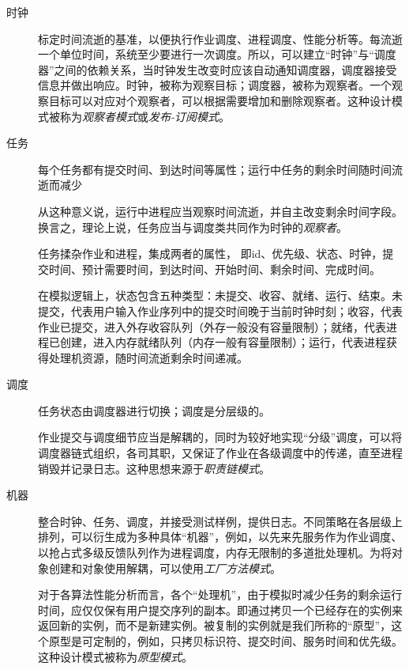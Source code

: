 \documentclass[12pt, a4paper, UTF8]{ctexart}
\begin{document}
\begin{description}
    \item[时钟] 标定时间流逝的基准，以便执行作业调度、进程调度、性能分析等。每流逝一个单位时间，系统至少要进行一次调度。所以，可以建立“时钟”与“调度器”之间的依赖关系，当时钟发生改变时应该自动通知调度器，调度器接受信息并做出响应。时钟，被称为观察目标；调度器，被称为观察者。一个观察目标可以对应对个观察者，可以根据需要增加和删除观察者。这种设计模式被称为\emph{观察者模式}或\emph{发布-订阅模式}。
    \item[任务] 每个任务都有提交时间、到达时间等属性；运行中任务的剩余时间随时间流逝而减少

        从这种意义说，运行中进程应当观察时间流逝，并自主改变剩余时间字段。换言之，理论上说，任务应当与调度类共同作为时钟的\emph{观察者}。

        任务揉杂作业和进程，集成两者的属性，
        即id、优先级、状态、时钟，提交时间、预计需要时间，到达时间、开始时间、剩余时间、完成时间。

        在模拟逻辑上，状态包含五种类型：未提交、收容、就绪、运行、结束。未提交，代表用户输入作业序列中的提交时间晚于当前时钟时刻；收容，代表作业已提交，进入外存收容队列（外存一般没有容量限制）；就绪，代表进程已创建，进入内存就绪队列（内存一般有容量限制）；运行，代表进程获得处理机资源，随时间流逝剩余时间递减。
    \item[调度] 任务状态由调度器进行切换；调度是分层级的。

        作业提交与调度细节应当是解耦的，同时为较好地实现“分级”调度，可以将调度器链式组织，各司其职，又保证了作业在各级调度中的传递，直至进程销毁并记录日志。这种思想来源于\emph{职责链模式}。

    \item[机器] 整合时钟、任务、调度，并接受测试样例，提供日志。不同策略在各层级上排列，可以衍生成为多种具体“机器”，例如，以先来先服务作为作业调度、以抢占式多级反馈队列作为进程调度，内存无限制的多道批处理机。为将对象创建和对象使用解耦，可以使用\emph{工厂方法模式}。

        对于各算法性能分析而言，各个“处理机”，由于模拟时减少任务的剩余运行时间，应仅仅保有用户提交序列的副本。即通过拷贝一个已经存在的实例来返回新的实例，而不是新建实例。被复制的实例就是我们所称的“原型”，这个原型是可定制的，例如，只拷贝标识符、提交时间、服务时间和优先级。这种设计模式被称为\emph{原型模式}。
\end{description}
\end{document}
